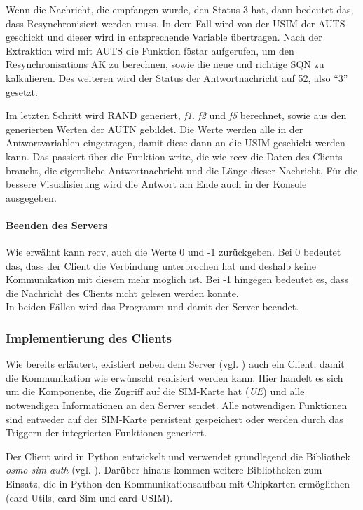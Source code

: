 		Wenn die Nachricht, die empfangen wurde, den Status 3 hat, dann bedeutet das, dass Resynchronisiert werden
		muss. In dem Fall wird von der USIM der AUTS geschickt und dieser wird in entsprechende Variable übertragen.
		Nach der Extraktion wird mit AUTS die Funktion f5star aufgerufen, um den Resynchronisations AK zu berechnen,
		sowie die neue und richtige SQN zu kalkulieren. Des weiteren wird der Status der Antwortnachricht auf 52, also ``3''
		gesetzt.
		
		Im letzten Schritt wird RAND generiert, \emph{f1}. \emph{f2} und \emph{f5} berechnet, sowie aus den generierten
		Werten der AUTN gebildet. Die Werte werden alle in der Antwortvariablen eingetragen, damit diese dann an die USIM
		geschickt werden kann. Das passiert über die Funktion write, die wie recv die Daten des Clients braucht, die eigentliche
		Antwortnachricht und die Länge dieser Nachricht. Für die bessere Visualisierung wird die Antwort am Ende auch in
		der Konsole ausgegeben.
		
		\paragraph{Beenden des Servers}
		Wie erwähnt kann recv, auch die Werte 0 und -1 zurückgeben. Bei 0 bedeutet das, dass der Client
		die Verbindung unterbrochen hat und deshalb keine Kommunikation mit diesem mehr möglich ist. Bei -1 hingegen bedeutet
		es, dass die Nachricht des Clients nicht gelesen werden konnte. \\
		In beiden Fällen wird das Programm und damit der Server beendet.

    \subsubsection[Implementierung des Clients (Schenkel)]{Implementierung des Clients}
    Wie bereits erläutert, existiert neben dem Server (vgl. ) auch ein Client,
    damit die Kommunikation wie erwünscht realisiert werden kann. Hier handelt es sich um die Komponente,
    die Zugriff auf die SIM-Karte hat (\emph{UE}) und alle notwendigen Informationen an den Server sendet.
    Alle notwendigen Funktionen sind entweder auf der SIM-Karte persistent gespeichert oder werden durch
    das Triggern der integrierten Funktionen generiert.

    Der Client wird in Python entwickelt und verwendet grundlegend die Bibliothek \textit{osmo-sim-auth}
    (vgl. ). Darüber hinaus kommen weitere  Bibliotheken zum Einsatz, die in
    Python den Kommunikationsaufbau mit Chipkarten ermöglichen (card-Utils, card-Sim und card-USIM).

